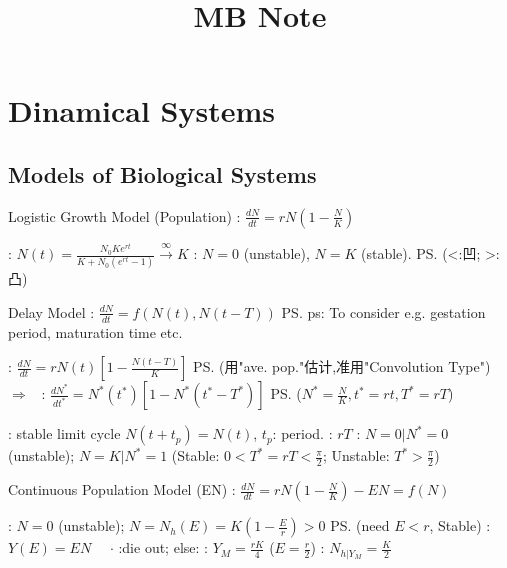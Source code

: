 \documentclass{note}
\title{MB Note}
\author{}
\begin{document}
\maketitle
\thispagestyle{fancy}

\vspace{-10pt}

\section{Dinamical Systems}

\subsection{Models of Biological Systems}

\begin{MyTh}{Logistic Growth Model (Population)}
    : $\frac{dN}{dt}=rN(1-\frac{N}{K})$ 

    \vspace{-2pt}
    {\footnotesize \quad {}: $N(t)=\frac{N_0Ke^{rt}}{K+N_0(e^{rt}-1)}\stackrel{\infty}{\to}K$ \qquad {}: $N=0$ (unstable), $N=K$ (stable). \qquad {} \ps{(<:凹; >:凸)}}
\end{MyTh}

\begin{MyTh}{Delay Model}
    : $\frac{dN}{dt}=f(N(t),N(t-T))$  \quad \ps{ps: To consider e.g. gestation period, maturation time etc.}

    {\scriptsize \quad {}: $\frac{dN}{dt}=rN(t)\left[1-\frac{N(t-T)}{K}\right]$ \ps{\tiny (用"ave. pop."估计,准用"Convolution Type")}  \ $\Rightarrow$ \ : $\frac{dN^*}{dt^*}=N^*(t^*)\left[1-N^*(t^*-T^*)\right]$ \ps{\tiny ($N^*=\frac{N}{K}, t^*=rt, T^*=rT$)}}

    {\scriptsize \quad {} : stable limit cycle $N(t+t_p)=N(t)$, $t_p$: period. : $rT$ : $N=0|N^*=0$ {\tiny (unstable)}; $N=K|N^*=1$ {\tiny (Stable: $0<T^*=rT<\frac{\pi}{2}$; Unstable: $T^*>\frac{\pi}{2}$)}}
\end{MyTh}

\begin{MyTh}{Continuous Population Model {\scriptsize (EN)}}
    : $\frac{dN}{dt}=rN(1-\frac{N}{K})-EN=f(N)$ 

    {\scriptsize \quad {}: $N=0$ {\tiny (unstable)}; $N=N_h(E)=K(1-\frac{E}{r})>0$ {\tiny \ps{(need $E<r$, Stable)}} : $Y(E)=EN$ \ \ $\cdot$ :die out; else: : $Y_M=\frac{rK}{4}$ {\tiny ($E=\frac{r}{2}$)} : $N_{h|Y_M}=\frac{K}{2}$}
\end{MyTh}
\end{document}
